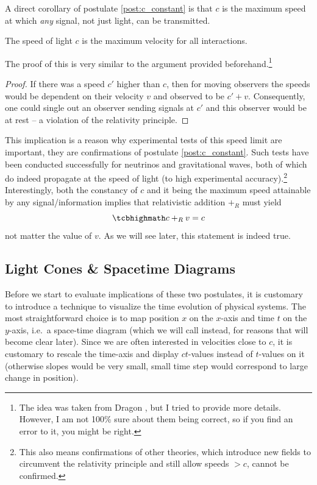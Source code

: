 \documentclass[../relativity_main.tex]{subfiles}
\begin{document}
A direct corollary of postulate \ref{post:c_constant} is that $c$ is the maximum speed at which \emph{any} signal, not just light, can be transmitted.
\begin{prop}%
	The speed of light $c$ is the maximum velocity for all interactions.
\end{prop}
The proof of this is very similar to the argument provided beforehand.\footnote{The idea was taken from Dragon \cite{dragon_geometry_srt}, but I tried to provide more details. However, I am not 100\% sure about them being correct, so if you find an error to it, you might be right.}
\begin{proof}
	If there was a speed $c'$ higher than $c$, then for moving observers the speeds would be dependent on their velocity $v$ and observed to be $c' + v$. Consequently, one could single out an observer sending signals at $c'$ and this observer would be at rest -- a violation of the relativity principle.
\end{proof}

This implication is a reason why experimental tests of this speed limit are important, they are confirmations of postulate \ref{post:c_constant}. Such tests have been conducted successfully for neutrinos and gravitational waves, both of which do indeed propagate at the speed of light (to high experimental accuracy).\footnote{This also means confirmations of other theories, which introduce new fields to circumvent the relativity principle and still allow speeds $> c$, cannot be confirmed.} Interestingly, both the constancy of $c$ and it being the maximum speed attainable by any signal/information implies that relativistic addition $+_R$ must yield
\begin{equation}
	\eqbox{
	c +_R v = c
	}
\end{equation}
not matter the value of $v$. As we will see later, this statement is indeed true.



		\subsection{Light Cones \& Spacetime Diagrams}
Before we start to evaluate implications of these two postulates, it is customary to introduce a technique to visualize the time evolution of physical systems. The most straightforward choice is to map position $x$ on the $x$-axis and time $t$ on the $y$-axis, i.e.~a space-time diagram (which we will call  instead, for reasons that will become clear later). Since we are often interested in velocities close to $c$, it is customary to rescale the time-axis and display $ct$-values instead of $t$-values on it (otherwise slopes would be very small, small time step would correspond to large change in position).
\end{document}
